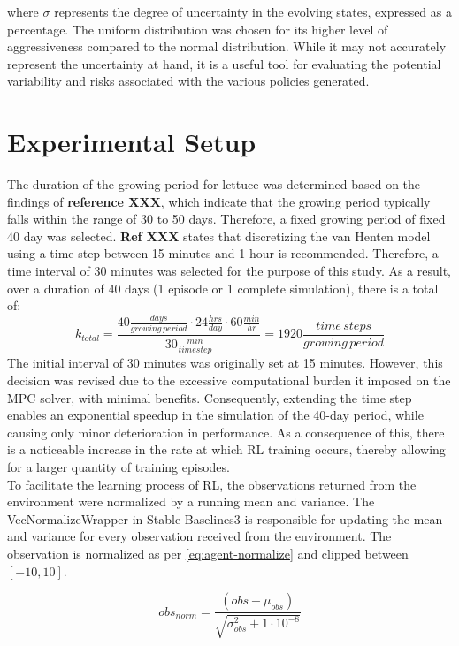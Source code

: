 where $\sigma$ represents the degree of uncertainty in the evolving states, expressed as a percentage. The uniform distribution was chosen for its higher level of aggressiveness compared to the normal distribution. While it may not accurately represent the uncertainty at hand, it is a useful tool for evaluating the potential variability and risks associated with the various policies generated.



\section{Experimental Setup} \label{section:experimental-setup}

The duration of the growing period for lettuce was determined based on the findings of \textbf{reference XXX}, which indicate that the growing period typically falls within the range of 30 to 50 days. Therefore, a fixed growing period of fixed 40 day was selected. \textbf{Ref XXX} states that discretizing the van Henten model using a time-step between 15 minutes and 1 hour is recommended. Therefore, a time interval of 30 minutes was selected for the purpose of this study. As a result, over a duration of 40 days (1 episode or 1 complete simulation), there is a total of:
$$
k_{total} = \frac{40 \frac{days}{growing \, period} \cdot 24 \frac{hrs}{day} \cdot 60 \frac{min}{hr}}{30 \frac{min}{timestep}} = 1920 \frac{time \, steps}{growing \, period}
$$
The initial interval of 30 minutes was originally set at 15 minutes. However, this decision was revised due to the excessive computational burden it imposed on the MPC solver, with minimal benefits. Consequently, extending the time step enables an exponential speedup in the simulation of the 40-day period, while causing only minor deterioration in performance. As a consequence of this, there is a noticeable increase in the rate at which RL training occurs, thereby allowing for a larger quantity of training episodes.
\\
To facilitate the learning process of RL, the observations returned from the environment were normalized by a running mean and variance. The VecNormalizeWrapper in Stable-Baselines3 is responsible for updating the mean and variance for every observation received from the environment. The observation is normalized as per \autoref{eq:agent-normalize} and clipped between $[-10,10]$.

\begin{equation}\label{eq:state-normalization}
    obs_{norm} = \frac{(obs - \mu_{obs}) }{\sqrt{\sigma^2_{obs} + 1\cdot 10^{-8}}}
\end{equation}


